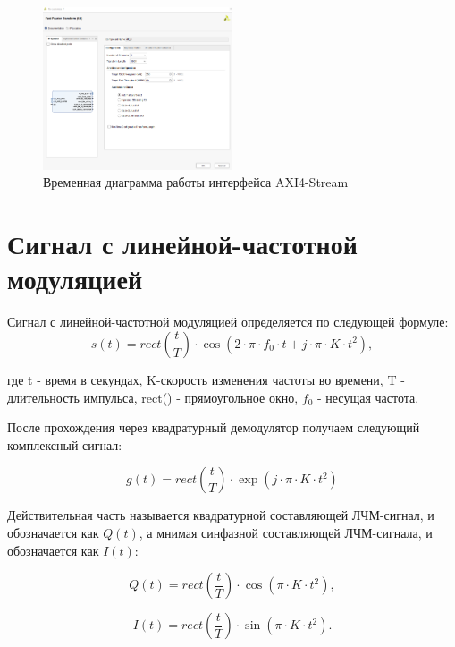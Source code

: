 \documentclass[a4paper,oneside ,14pt]{extreport}
\begin{document}
\begin{figure}[h]
	\centering
	\includegraphics[width=0.5\textwidth]{image/fft_config.png}
	\caption{Временная диаграмма работы интерфейса AXI4-Stream}
	\label{fft_detailed_implem}
\end{figure}
	
\section{Сигнал с линейной-частотной модуляцией}

Сигнал с линейной-частотной модуляцией определяется по следующей формуле:
\begin{equation}	
	s(t) = rect(\frac{t}{T}) \cdot \cos(2 \cdot \pi \cdot f_0 \cdot t + j \cdot \pi \cdot K \cdot t^{2}),
\end{equation}

где t - время в секундах, K-скорость изменения частоты во времени, T - длительность импульса, rect() - прямоугольное окно, \(f_0\) - несущая частота.

После прохождения через квадратурный демодулятор получаем следующий комплексный сигнал:

\begin{equation}	
	g(t) = rect(\frac{t}{T}) \cdot \exp(j \cdot \pi \cdot K \cdot t^{2})
\end{equation}

Действительная часть называется квадратурной
составляющей ЛЧМ-сигнал, и обозначается как \(Q(t)\), а мнимая 
синфазной составляющей ЛЧМ-сигнала, и обозначается как \(I(t)\):

\begin{equation}	
	Q(t) = rect(\frac{t}{T}) \cdot \cos(\pi \cdot K \cdot t^{2}),
\end{equation}

\begin{equation}	
	I(t) = rect(\frac{t}{T}) \cdot \sin(\pi \cdot K \cdot t^{2}).
\end{equation}
\end{document}

